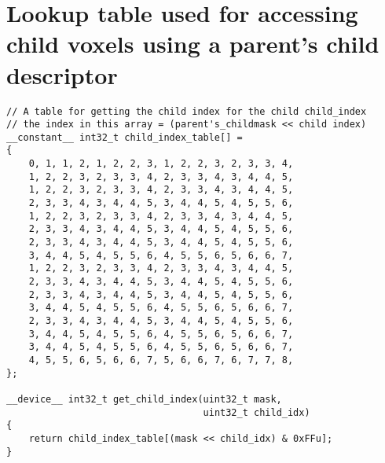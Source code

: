 \section{Lookup table used for accessing child voxels using a parent's child descriptor}
\label{app:lookup-table}

\begin{lstlisting}[frame=single]
// A table for getting the child index for the child child_index
// the index in this array = (parent's_childmask << child index)
__constant__ int32_t child_index_table[] =
{
	0, 1, 1, 2, 1, 2, 2, 3, 1, 2, 2, 3, 2, 3, 3, 4,
	1, 2, 2, 3, 2, 3, 3, 4, 2, 3, 3, 4, 3, 4, 4, 5,
	1, 2, 2, 3, 2, 3, 3, 4, 2, 3, 3, 4, 3, 4, 4, 5,
	2, 3, 3, 4, 3, 4, 4, 5, 3, 4, 4, 5, 4, 5, 5, 6,
	1, 2, 2, 3, 2, 3, 3, 4, 2, 3, 3, 4, 3, 4, 4, 5,
	2, 3, 3, 4, 3, 4, 4, 5, 3, 4, 4, 5, 4, 5, 5, 6,
	2, 3, 3, 4, 3, 4, 4, 5, 3, 4, 4, 5, 4, 5, 5, 6,
	3, 4, 4, 5, 4, 5, 5, 6, 4, 5, 5, 6, 5, 6, 6, 7,
	1, 2, 2, 3, 2, 3, 3, 4, 2, 3, 3, 4, 3, 4, 4, 5,
	2, 3, 3, 4, 3, 4, 4, 5, 3, 4, 4, 5, 4, 5, 5, 6,
	2, 3, 3, 4, 3, 4, 4, 5, 3, 4, 4, 5, 4, 5, 5, 6,
	3, 4, 4, 5, 4, 5, 5, 6, 4, 5, 5, 6, 5, 6, 6, 7,
	2, 3, 3, 4, 3, 4, 4, 5, 3, 4, 4, 5, 4, 5, 5, 6,
	3, 4, 4, 5, 4, 5, 5, 6, 4, 5, 5, 6, 5, 6, 6, 7,
	3, 4, 4, 5, 4, 5, 5, 6, 4, 5, 5, 6, 5, 6, 6, 7,
	4, 5, 5, 6, 5, 6, 6, 7, 5, 6, 6, 7, 6, 7, 7, 8,
};

__device__ int32_t get_child_index(uint32_t mask,
                                   uint32_t child_idx)
{
	return child_index_table[(mask << child_idx) & 0xFFu];
}
\end{lstlisting}